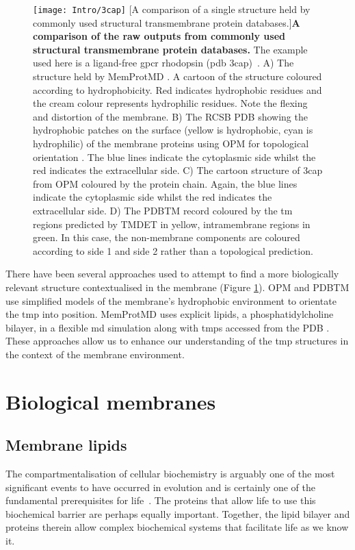 \begin{figure}[ht!]
\centering
\texttt{[image: Intro/3cap]}
		[A comparison of a single structure held by commonly used structural transmembrane protein databases.]{\textbf{A comparison of the raw outputs from commonly used structural transmembrane protein databases.}
		The example used here is a ligand\--free \gls{gpcr} rhodopsin (\gls{pdb} 3cap)~\cite{Park2008}.
		A) The structure held by MemProtMD \cite{Stansfeld2015}. A cartoon of the structure coloured according to hydrophobicity. Red indicates hydrophobic residues and the cream colour represents hydrophilic residues. Note the flexing and distortion of the membrane.
		B) The RCSB PDB \cite{Berman2000} showing the hydrophobic patches on the surface (yellow is hydrophobic, cyan is hydrophilic) of the membrane proteins using OPM for topological orientation \cite{Lomize2012}.
		The blue lines indicate the cytoplasmic side whilst the red indicates the extracellular side.
		C) The cartoon structure of 3cap from OPM \cite{Lomize2012} coloured by the protein chain.
		Again, the blue lines indicate the cytoplasmic side whilst the red indicates the extracellular side.
		D) The PDBTM \cite{Kozma2012} record coloured by the \gls{tm} regions predicted by TMDET \cite{Tusnady2005} in yellow, intramembrane regions in green.
		In this case, the non\--membrane components are coloured according to side 1 and side 2 rather than a topological prediction.
		}

\label{fig:3cap}
\end{figure}

There have been several approaches used to attempt to find a more biologically relevant structure contextualised in the membrane (Figure \ref{fig:3cap}).
OPM \cite{Lomize2012} and PDBTM \cite{Kozma2012} use simplified models of the membrane's hydrophobic environment to orientate the \gls{tmp} into position.
MemProtMD \cite{Stansfeld2015} uses explicit lipids, a phosphatidylcholine bilayer, in a flexible \gls{md} simulation  along with \gls{tmp}s accessed from the PDB \cite{Berman2000}.
These approaches allow us to enhance our understanding of the \gls{tmp} structures in the context of the membrane environment.

\section{Biological membranes}
\subsection{Membrane lipids}
The compartmentalisation of cellular biochemistry is arguably one of the most significant events to have occurred in evolution and is certainly one of the fundamental prerequisites for life~\cite{Koshland2002}.
The proteins that allow life to use this biochemical barrier are perhaps equally important.
Together, the lipid bilayer and proteins therein allow complex biochemical systems that facilitate life as we know it.

